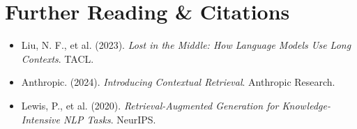 \section{Further Reading \protect\& Citations}
\begin{itemize}[leftmargin=18pt]
  \item Liu, N. F., et al. (2023). \emph{Lost in the Middle: How Language Models Use Long Contexts}. TACL.
  \item Anthropic. (2024). \emph{Introducing Contextual Retrieval}. Anthropic Research.
  \item Lewis, P., et al. (2020). \emph{Retrieval-Augmented Generation for Knowledge-Intensive NLP Tasks}. NeurIPS.
\end{itemize}
